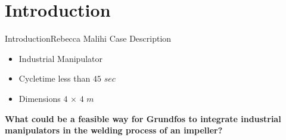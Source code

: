 \section{Introduction}

\begin{frame}{Introduction}{Rebecca Malihi}
Case Description
\begin{itemize}
    \item Industrial Manipulator
    \item Cycletime less than $45$ $sec$
    \item Dimensions $4$ $\times$ $4$ $m$
\end{itemize}
\begin{center}
\textbf{What could be a feasible way for Grundfos to integrate industrial manipulators
in the welding process of an impeller?}
\end{center}





\end{frame}